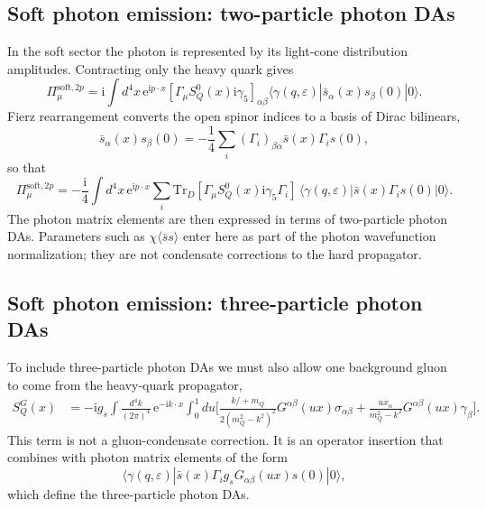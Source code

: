 \documentclass[11pt]{article}
\newcommand{\ii}{\mathrm{i}}
\newcommand{\ee}{\mathrm{e}}
\newcommand{\Tr}{\mathrm{Tr}}
\newcommand{\slashp}[1]{#1\!\!\!/}
\newcommand{\sbar}{\bar s}
\begin{document}
\subsection{Soft photon emission: two-particle photon DAs}

In the soft sector the photon is represented by its light-cone distribution
amplitudes.  Contracting only the heavy quark gives
\begin{equation}
  \Pi_\mu^{\mathrm{soft},2p}
  =
  \ii\int d^4x\,\ee^{\ii p\cdot x}
  [\Gamma_\mu S_Q^0(x)\ii\gamma_5]_{\alpha\beta}
  \langle\gamma(q,\varepsilon)|
  \sbar_\alpha(x)s_\beta(0)
  |0\rangle .
\end{equation}
Fierz rearrangement converts the open spinor indices to a basis of Dirac
bilinears,
\begin{equation}
  \sbar_\alpha(x)s_\beta(0)
  =
  -\frac14\sum_i(\Gamma_i)_{\beta\alpha}
  \sbar(x)\Gamma_i s(0),
\end{equation}
so that
\begin{equation}
  \Pi_\mu^{\mathrm{soft},2p}
  =
  -\frac{\ii}{4}
  \int d^4x\,\ee^{\ii p\cdot x}
  \sum_i
  \Tr_D[\Gamma_\mu S_Q^0(x)\ii\gamma_5\Gamma_i]\,
  \langle\gamma(q,\varepsilon)|
  \sbar(x)\Gamma_i s(0)
  |0\rangle .
\end{equation}
The photon matrix elements are then expressed in terms of two-particle photon
DAs.  Parameters such as $\chi\langle\bar s s\rangle$ enter here as part of the
photon wavefunction normalization; they are not condensate corrections to the
hard propagator.

\subsection{Soft photon emission: three-particle photon DAs}

To include three-particle photon DAs we must also allow one background gluon to
come from the heavy-quark propagator,
\begin{align}
  S_Q^G(x)
  &=
  -\ii g_s
  \int\frac{d^4k}{(2\pi)^4}\,\ee^{-\ii k\cdot x}
  \int_0^1du
  \Bigg[
    \frac{\slashp{k}+m_Q}{2(m_Q^2-k^2)^2}
    G^{\alpha\beta}(ux)\sigma_{\alpha\beta}
    +
    \frac{u x_\alpha}{m_Q^2-k^2}
    G^{\alpha\beta}(ux)\gamma_\beta
  \Bigg].
  \label{eq:gluon-propagator}
\end{align}
This term is not a gluon-condensate correction.  It is an operator insertion
that combines with photon matrix elements of the form
\begin{equation}
  \langle\gamma(q,\varepsilon)|
  \sbar(x)\Gamma_i g_sG_{\alpha\beta}(ux)s(0)
  |0\rangle ,
\end{equation}
which define the three-particle photon DAs.
\end{document}
